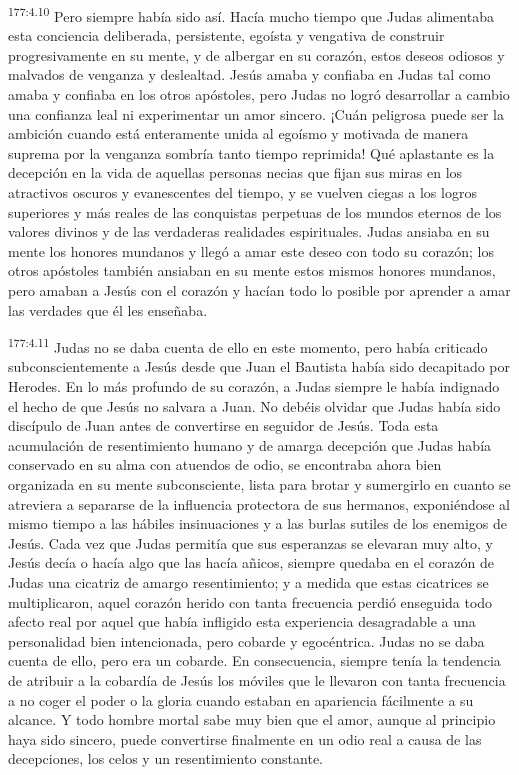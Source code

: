 \par
\textsuperscript{177:4.10} Pero siempre había sido así. Hacía mucho tiempo que Judas alimentaba esta conciencia deliberada, persistente, egoísta y vengativa de construir progresivamente en su mente, y de albergar en su corazón, estos deseos odiosos y malvados de venganza y deslealtad. Jesús amaba y confiaba en Judas tal como amaba y confiaba en los otros apóstoles, pero Judas no logró desarrollar a cambio una confianza leal ni experimentar un amor sincero. ¡Cuán peligrosa puede ser la ambición cuando está enteramente unida al egoísmo y motivada de manera suprema por la venganza sombría tanto tiempo reprimida! Qué aplastante es la decepción en la vida de aquellas personas necias que fijan sus miras en los atractivos oscuros y evanescentes del tiempo, y se vuelven ciegas a los logros superiores y más reales de las conquistas perpetuas de los mundos eternos de los valores divinos y de las verdaderas realidades espirituales. Judas ansiaba en su mente los honores mundanos y llegó a amar este deseo con todo su corazón; los otros apóstoles también ansiaban en su mente estos mismos honores mundanos, pero amaban a Jesús con el corazón y hacían todo lo posible por aprender a amar las verdades que él les enseñaba.

\par
\textsuperscript{177:4.11} Judas no se daba cuenta de ello en este momento, pero había criticado subconscientemente a Jesús desde que Juan el Bautista había sido decapitado por Herodes. En lo más profundo de su corazón, a Judas siempre le había indignado el hecho de que Jesús no salvara a Juan. No debéis olvidar que Judas había sido discípulo de Juan antes de convertirse en seguidor de Jesús. Toda esta acumulación de resentimiento humano y de amarga decepción que Judas había conservado en su alma con atuendos de odio, se encontraba ahora bien organizada en su mente subconsciente, lista para brotar y sumergirlo en cuanto se atreviera a separarse de la influencia protectora de sus hermanos, exponiéndose al mismo tiempo a las hábiles insinuaciones y a las burlas sutiles de los enemigos de Jesús. Cada vez que Judas permitía que sus esperanzas se elevaran muy alto, y Jesús decía o hacía algo que las hacía añicos, siempre quedaba en el corazón de Judas una cicatriz de amargo resentimiento; y a medida que estas cicatrices se multiplicaron, aquel corazón herido con tanta frecuencia perdió enseguida todo afecto real por aquel que había infligido esta experiencia desagradable a una personalidad bien intencionada, pero cobarde y egocéntrica. Judas no se daba cuenta de ello, pero era un cobarde. En consecuencia, siempre tenía la tendencia de atribuir a la cobardía de Jesús los móviles que le llevaron con tanta frecuencia a no coger el poder o la gloria cuando estaban en apariencia fácilmente a su alcance. Y todo hombre mortal sabe muy bien que el amor, aunque al principio haya sido sincero, puede convertirse finalmente en un odio real a causa de las decepciones, los celos y un resentimiento constante.


